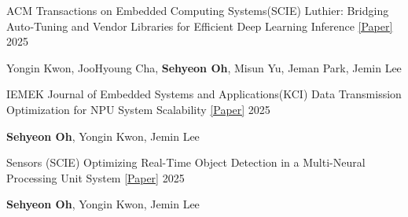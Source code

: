 

\begin{cventries}

    \cvpaper
    {ACM Transactions on Embedded Computing Systems(SCIE)} %
    {{Luthier: Bridging Auto‑Tuning and Vendor Libraries for Efficient Deep Learning Inference}
    \href{https://ksp.etri.re.kr/ksp/article/file/71347.pdf}{[Paper]}
    } %
    {} %
    {2025} %
    {
      \begin{cvitems} %
        \item{Yongin Kwon, JooHyoung Cha, \textbf{Sehyeon Oh}, Misun Yu, Jeman Park, Jemin Lee}
      \end{cvitems}
    }

    \cvpaper
    {IEMEK Journal of Embedded Systems and Applications(KCI)} %
    {{Data Transmission Optimization for NPU System Scalability}
    \href{https://ksp.etri.re.kr/ksp/article/file/70763.pdf}{[Paper]}
    } %
    {} %
    {2025} %
    {
      \begin{cvitems} %
        \item{\textbf{Sehyeon Oh}, Yongin Kwon, Jemin Lee}
      \end{cvitems}
    }

    \cvpaper
    {Sensors (SCIE)} %
    {{Optimizing Real-Time Object Detection in a Multi-Neural Processing Unit System}
    \href{https://ksp.etri.re.kr/ksp/article/file/70481.pdf}{[Paper]}
    } %
    {} %
    {2025} %
    {
      \begin{cvitems} %
        \item{\textbf{Sehyeon Oh}, Yongin Kwon, Jemin Lee}
      \end{cvitems}
    }

\end{cventries}

